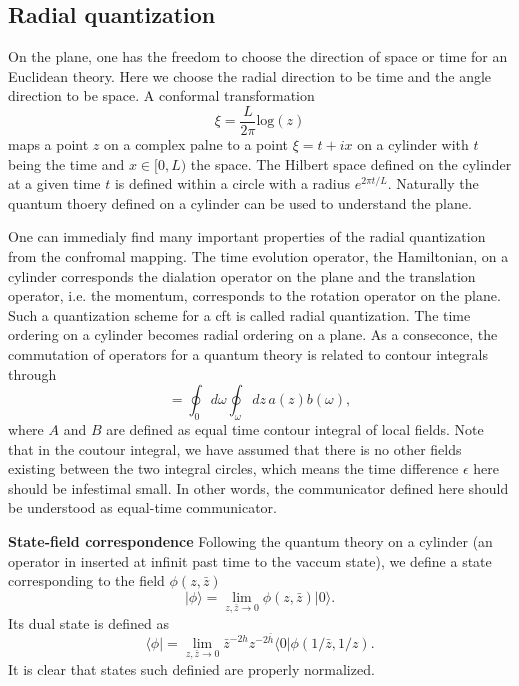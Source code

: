 \documentclass[submission, PhysLectNotes]{SciPost}
\begin{document}
\subsection{Radial quantization}
On the plane, one has the freedom to choose the direction of space or time for an Euclidean theory. Here we choose the radial direction to be time and the angle direction to be space. A conformal transformation
\begin{equation}
	\xi = \frac{L}{2\pi}\mathrm{log}\left(z\right)
\end{equation}
maps a point $z$ on a complex palne to a point $\xi=t+ix$ on a cylinder with $t$ being the time and $x\in[0,L)$ the space. The Hilbert space defined on the cylinder at a given time $t$ is defined within a circle with a radius $e^{2\pi t/L}$. Naturally the quantum thoery defined on a cylinder can be used to understand the plane.

One can immedialy find many important properties of the radial quantization from the confromal mapping. The time evolution operator, the Hamiltonian, on a cylinder corresponds the dialation operator on the plane and the translation operator, i.e.  the momentum, corresponds to the rotation operator on the plane. Such a quantization scheme for a cft is called radial quantization. The time ordering on a cylinder becomes radial ordering on a plane. As  a conseconce, the commutation of operators for a quantum theory is related to contour integrals through
\begin{equation}
	[A,B] = \oint_0 d\omega \oint_\omega dz \, a(z)b(\omega),
\end{equation}
where $A$ and $B$ are defined as equal time contour integral of local fields. Note that in the coutour integral, we have assumed that there is no other fields existing between the two integral circles, which means the time difference $\epsilon$ here should be infestimal small. In other words, the communicator defined here should be understood as equal-time communicator.

{\bf State-field correspondence} Following the quantum theory on a cylinder (an operator in inserted at infinit past time to the vaccum state), we define a state corresponding to the field $\phi(z,\bar{z})$
\begin{equation}
	\vert \phi \rangle = \lim_{z,\bar{z}\to 0}\phi(z,\bar{z})\vert0\rangle.
\end{equation}
Its dual state is defined as
\begin{equation}
	\langle \phi \vert = \lim_{z,\bar{z}\to 0} \bar{z}^{-2h}z^{-2\bar{h}} \langle 0 \vert \phi(1/\bar{z},1/z).
\end{equation}
It is clear that states such definied are properly normalized.
\end{document}
